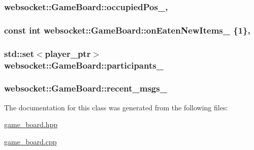 \subsubsection[{\texorpdfstring{occupied\+Pos\+\_\+}{occupiedPos_}}]{ websocket\+::\+Game\+Board\+::occupied\+Pos\+\_\+\hspace{0.3cm}{\ttfamily [static]}, {\ttfamily [private]}}\hypertarget{classwebsocket_1_1GameBoard_aca1010defacfdd0ea5f032035ce7105e}{}\label{classwebsocket_1_1GameBoard_aca1010defacfdd0ea5f032035ce7105e}
\subsubsection[{\texorpdfstring{on\+Eaten\+New\+Items\+\_\+}{onEatenNewItems_}}]{\setlength{\rightskip}{0pt plus 5cm}const int websocket\+::\+Game\+Board\+::on\+Eaten\+New\+Items\+\_\+ \{1\}\hspace{0.3cm}{\ttfamily [static]}, {\ttfamily [private]}}\hypertarget{classwebsocket_1_1GameBoard_a8fe312bcfc33ae3d624a0fdb02f40622}{}\label{classwebsocket_1_1GameBoard_a8fe312bcfc33ae3d624a0fdb02f40622}
\subsubsection[{\texorpdfstring{participants\+\_\+}{participants_}}]{\setlength{\rightskip}{0pt plus 5cm}std\+::set$<${\bf player\+\_\+ptr}$>$ websocket\+::\+Game\+Board\+::participants\+\_\+\hspace{0.3cm}{\ttfamily [private]}}\hypertarget{classwebsocket_1_1GameBoard_a49ad7c4c31e144021a4c7e12c73d0433}{}\label{classwebsocket_1_1GameBoard_a49ad7c4c31e144021a4c7e12c73d0433}
\subsubsection[{\texorpdfstring{recent\+\_\+msgs\+\_\+}{recent_msgs_}}]{ websocket\+::\+Game\+Board\+::recent\+\_\+msgs\+\_\+\hspace{0.3cm}{\ttfamily [private]}}\hypertarget{classwebsocket_1_1GameBoard_a87c11dd6d2f39fa8b0100059c27179a7}{}\label{classwebsocket_1_1GameBoard_a87c11dd6d2f39fa8b0100059c27179a7}


The documentation for this class was generated from the following files\+:\begin{DoxyCompactItemize}
\item 
\hyperlink{game__board_8hpp}{game\+\_\+board.\+hpp}\item 
\hyperlink{game__board_8cpp}{game\+\_\+board.\+cpp}\end{DoxyCompactItemize}
